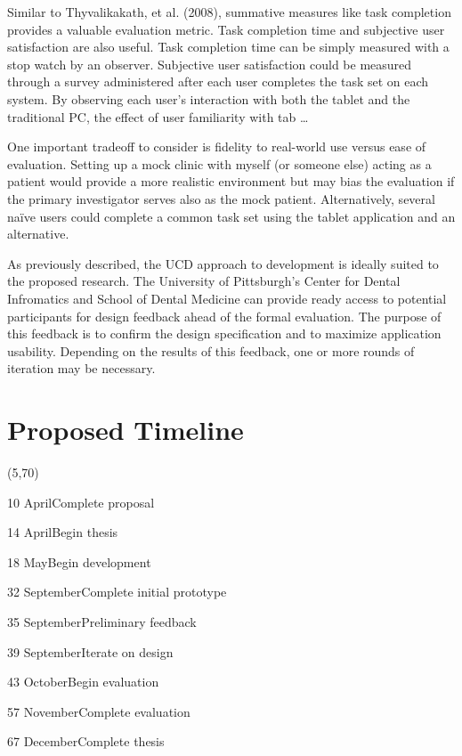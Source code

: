 \documentclass[11pt]{article}
\begin{document}
Similar to Thyvalikakath, et al. (2008), summative measures like task completion provides a valuable evaluation metric. Task completion time and subjective user satisfaction are also useful.\cite{Chin1998Development-of-} Task completion time can be simply measured with a stop watch by an observer. Subjective user satisfaction could be measured through a survey administered after each user completes the task set on each system. By observing each user's interaction with both the tablet and the traditional PC, the effect of user familiarity with tab \ldots

One important tradeoff to consider is fidelity to real-world use versus ease of evaluation. Setting up a mock clinic with myself (or someone else) acting as a patient would provide a more realistic environment but may bias the evaluation if the primary investigator serves also as the mock patient. Alternatively, several na\"{i}ve users could complete a common task set using the tablet application and an alternative.

As previously described, the UCD approach to development is ideally suited to the proposed research. The University of Pittsburgh's Center for Dental Infromatics and School of Dental Medicine can provide ready access to potential participants for design feedback ahead of the formal evaluation. The purpose of this feedback is to confirm the design specification and to maximize application usability. Depending on the results of this feedback, one or more rounds of iteration may be necessary.  

\section{Proposed Timeline}

\begin{timeline}{2in}(5,70)
\optrule
  \item[10]{April}{Complete proposal}
  \item[14]{April}{Begin thesis}
  \item[18]{May}{Begin development}
  \item[32]{September}{Complete initial prototype}
  \item[35]{September}{Preliminary feedback}
  \item[39]{September}{Iterate on design}
  \item[43]{October}{Begin evaluation}
  \item[57]{November}{Complete evaluation}
  \item[67]{December}{Complete thesis}
\end{timeline}%
\\

\footnotesize{
}
\end{document}
